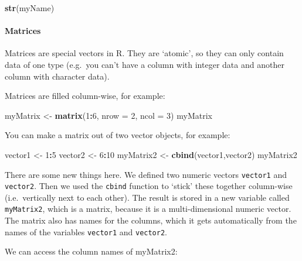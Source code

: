 \documentclass[]{article}
\newenvironment{Shaded}{\begin{snugshade}}{\end{snugshade}}
\newcommand{\DataTypeTok}[1]{\textcolor[rgb]{0.13,0.29,0.53}{#1}}
\newcommand{\DecValTok}[1]{\textcolor[rgb]{0.00,0.00,0.81}{#1}}
\newcommand{\KeywordTok}[1]{\textcolor[rgb]{0.13,0.29,0.53}{\textbf{#1}}}
\newcommand{\NormalTok}[1]{#1}
\newcommand{\OperatorTok}[1]{\textcolor[rgb]{0.81,0.36,0.00}{\textbf{#1}}}
\newcommand{\StringTok}[1]{\textcolor[rgb]{0.31,0.60,0.02}{#1}}
\let\oldparagraph\paragraph
\renewcommand{\paragraph}[1]{\oldparagraph{#1}\mbox{}}
\begin{document}
\begin{Shaded}
\begin{Highlighting}[]
\KeywordTok{str}\NormalTok{(myName)}
\end{Highlighting}
\end{Shaded}

\hypertarget{matrices}{%
\paragraph{Matrices}\label{matrices}}

Matrices are special vectors in R. They are `atomic', so they can only
contain data of one type (e.g.~you can't have a column with integer data
and another column with character data).

Matrices are filled column-wise, for example:

\begin{Shaded}
\begin{Highlighting}[]
\NormalTok{myMatrix <-}\StringTok{ }\KeywordTok{matrix}\NormalTok{(}\DecValTok{1}\OperatorTok{:}\DecValTok{6}\NormalTok{, }\DataTypeTok{nrow =} \DecValTok{2}\NormalTok{, }\DataTypeTok{ncol =} \DecValTok{3}\NormalTok{)}
\NormalTok{myMatrix}
\end{Highlighting}
\end{Shaded}

You can make a matrix out of two vector objects, for example:

\begin{Shaded}
\begin{Highlighting}[]
\NormalTok{vector1 <-}\StringTok{ }\DecValTok{1}\OperatorTok{:}\DecValTok{5}
\NormalTok{vector2 <-}\StringTok{ }\DecValTok{6}\OperatorTok{:}\DecValTok{10}
\NormalTok{myMatrix2 <-}\StringTok{ }\KeywordTok{cbind}\NormalTok{(vector1,vector2)}
\NormalTok{myMatrix2}
\end{Highlighting}
\end{Shaded}

There are some new things here. We defined two numeric vectors
\texttt{vector1} and \texttt{vector2}. Then we used the \texttt{cbind}
function to `stick' these together column-wise (i.e.~vertically next to
each other). The result is stored in a new variable called
\texttt{myMatrix2}, which is a matrix, because it is a multi-dimensional
numeric vector. The matrix also has names for the columns, which it gets
automatically from the names of the variables \texttt{vector1} and
\texttt{vector2}.

We can access the column names of myMatrix2:
\end{document}
